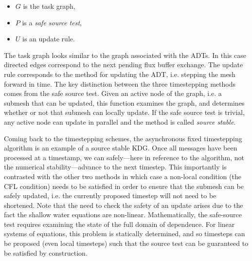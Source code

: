 \begin{itemize}
\item $G$ is the task graph,
\item $P$ is a {\em safe source test},
\item $U$ is an update rule.
\end{itemize}
The task graph looks similar to the graph associated with the ADTs. In this case directed edges correspond to the next pending flux buffer exchange. The update rule corresponds to the method for updating the ADT, i.e. stepping the mesh forward in time. The key distinction between the three timestepping methods comes from the safe source test. Given an active node of the graph, i.e. a submesh that can be updated, this function examines the graph, and determines whether or not that submesh can locally update. If the safe source test is trivial, any active node can update in parallel and the method is called {\em source stable}.

Coming back to the timestepping schemes, the asynchronous fixed timestepping algorithm is an example of a source stable KDG. Once all messages have been processed at a timestamp, we can safely---here in reference to the algorithm, not the numerical stability---advance to the next timestep. This importantly is contrasted with the other two methods in which case a non-local condition (the CFL condition) needs to be satisfied in order to ensure that the submesh can be safely updated, i.e. the currently proposed timestep will not need to be shortened. Note that the need to check the safety of an update arises due to the fact the shallow water equations are non-linear. Mathematically, the safe-source test requires examining the state of the full domain of dependence. For linear systems of equations, this problem is statically determined, and so timesteps can be proposed (even local timesteps) such that the source test can be guaranteed to be satisfied by construction.

